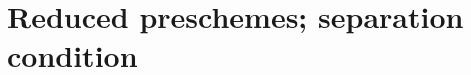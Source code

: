 \section{Reduced preschemes; separation condition}
\label{section-reduced-preschemes-and-separation-condition}

